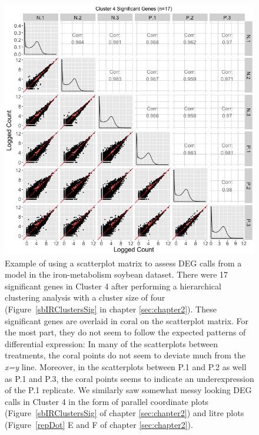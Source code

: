 \documentclass[11pt,a4paper,oldfontcommands,openany]{memoir}
\numberwithin{equation}{section} %
\begin{document}
\clearpage
\null
\begin{figure}[t!]
\begin{framed}
\centerline{\includegraphics[width=\columnwidth]{MakeFigures/sbIRClusterSigSM4.jpg}}
\end{framed}
\caption{Example of using a scatterplot matrix to assess DEG calls from a model in the iron-metabolism soybean dataset. There were 17 significant genes in Cluster 4 after performing a hierarchical clustering analysis with a cluster size of four (Figure~\ref{sbIRClustersSig} in chapter \ref{sec:chapter2}). These significant genes are overlaid in coral on the scatterplot matrix. For the most part, they do not seem to follow the expected patterns of differential expression: In many of the scatterplots between treatments, the coral points do not seem to deviate much from the \textit{x=y} line. Moreover, in the scatterplots between P.1 and P.2 as well as P.1 and P.3, the coral points seems to indicate an underexpression of the P.1 replicate. We similarly saw somewhat messy looking DEG calls in Cluster 4 in the form of parallel coordinate plots (Figure~\ref{sbIRClustersSig} of chapter \ref{sec:chapter2}) and litre plots (Figure~\ref{repDot} E and F of chapter \ref{sec:chapter2}).
\label{sbIRClusterSigSM4}}
\end{figure}  
\end{document}
